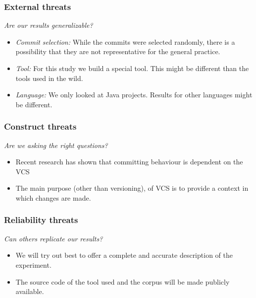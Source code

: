 \documentclass{beamer}
\begin{document}
\begin{frame}
\frametitle{External threats}
\emph{Are our results generalizable?}

\begin{itemize}
	\item{\emph{Commit selection:}} While the commits were selected randomly, there is a possibility that they are not representative for the general practice. 
	\item{\emph{Tool:}} For this study we build a special tool. 
	This might be different than the tools used in the wild.
	\item{\emph{Language:}} We only looked at Java projects.
	Results for other languages might be different.
\end{itemize}
\end{frame}

\begin{frame}
\frametitle{Construct threats}

\emph{Are we asking the right questions?}

\begin{itemize}
	\item Recent research has shown that committing behaviour is dependent on the VCS
	\item The main purpose (other than versioning), of VCS is to provide a context in which changes are made.
\end{itemize}
\end{frame}

\begin{frame}
\frametitle{Reliability threats}
\emph{Can others replicate our results?}

\begin{itemize}
	\item We will try out best to offer a complete and accurate description of the experiment.
	\item The source code of the tool used and the corpus will be made publicly available.
\end{itemize}
\end{frame}
\end{document}
